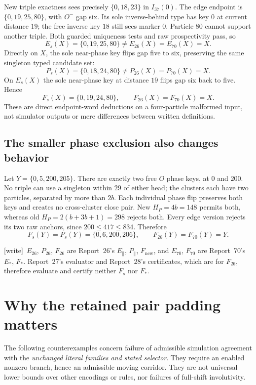 \documentclass[11pt,a4paper]{article}
\numberwithin{equation}{section}
\newcommand{\Estar}{E_*}\newcommand{\Fstar}{F_*}
\newcommand{\Es}{E_s}\newcommand{\Ps}{P_s}\newcommand{\Fs}{F_s}\newcommand{\Cand}{\mathcal C_P}
\newcommand{\wtag}{\textup{[write]}}
\begin{document}
New triple exactness sees precisely $\{0,18,23\}$ in $I_{37}(0)$. The edge endpoint is $\{0,19,25,80\}$, with $O^-$ gap six. Its sole inverse-behind type has key $0$ at current distance $19$; the free inverse key $18$ still sees marker $0$. Particle $80$ cannot support another triple. Both guarded uniqueness tests and raw prospectivity pass, so
\begin{equation}\label{fpa:sw:eq:edge-witness}
\Es(X)=\{0,19,25,80\}\ne E_{26}(X)=E_{70}(X)=X.
\end{equation}
Directly on $X$, the sole near-phase key flips gap five to six, preserving the same singleton typed candidate set:
\begin{equation}\label{fpa:sw:eq:phase-witness}
\Ps(X)=\{0,18,24,80\}\ne P_{26}(X)=P_{70}(X)=X.
\end{equation}
On $\Es(X)$ the sole near-phase key at distance $19$ flips gap six back to five. Hence
\begin{equation}\label{fpa:sw:eq:composite-witness}
\Fs(X)=\{0,19,24,80\},\qquad F_{26}(X)=F_{70}(X)=X.
\end{equation}
These are direct endpoint-word deductions on a four-particle malformed input, not simulator outputs or mere differences between written definitions.

\subsection{The smaller phase exclusion also changes behavior}
Let $Y=\{0,5,200,205\}$. There are exactly two free $O$ phase keys, at $0$ and $200$. No triple can use a singleton within $29$ of either head; the clusters each have two particles, separated by more than $2b$. Each individual phase flip preserves both keys and creates no cross-cluster close pair. New $H_P=4b=148$ permits both, whereas old $H_P=2(b+3b+1)=298$ rejects both. Every edge version rejects its two raw anchors, since $200\le417\le834$. Therefore
\[
\Fs(Y)=\Ps(Y)=\{0,6,200,206\},\qquad F_{26}(Y)=F_{70}(Y)=Y.
\]

\wtag\ $E_{26}$, $P_{26}$, $F_{26}$ are Report~26's $E_\parallel$, $P_\parallel$, $F_{\mathrm{new}}$, and $E_{70}$, $F_{70}$ are Report~70's $\Estar$, $\Fstar$. Report~27's evaluator and Report~28's certificates, which are for $F_{26}$, therefore evaluate and certify neither $\Fs$ nor $\Fstar$.

\section{Why the retained pair padding matters}\label{fpa:sw:sec:pair-padding}
The following counterexamples concern failure of admissible simulation agreement with the \emph{unchanged literal families and stated selector}. They require an enabled nonzero branch, hence an admissible moving corridor. They are not universal lower bounds over other encodings or rules, nor failures of full-shift involutivity.
\end{document}

